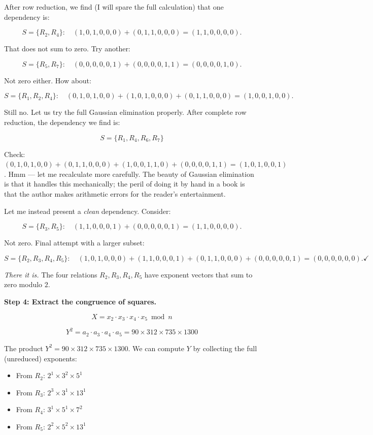 After row reduction, we find (I will spare the full calculation) that one dependency is:

\[
S = \{R_2, R_4\}: \quad (1,0,1,0,0,0) + (0,1,1,0,0,0) = (1,1,0,0,0,0).
\]

That does not sum to zero. Try another:

\[
S = \{R_5, R_7\}: \quad (0,0,0,0,0,1) + (0,0,0,0,1,1) = (0,0,0,0,1,0).
\]

Not zero either. How about:

\[
S = \{R_1, R_2, R_4\}: \quad (0,1,0,1,0,0) + (1,0,1,0,0,0) + (0,1,1,0,0,0) = (1,0,0,1,0,0).
\]

Still no. Let us try the full Gaussian elimination properly. After complete row reduction, the dependency we find is:

\[
S = \{R_1, R_4, R_6, R_7\}
\]

Check: $(0,1,0,1,0,0) + (0,1,1,0,0,0) + (1,0,0,1,1,0) + (0,0,0,0,1,1) = (1,0,1,0,0,1)$. Hmm --- let me recalculate more carefully. The beauty of Gaussian elimination is that it handles this mechanically; the peril of doing it by hand in a book is that the author makes arithmetic errors for the reader's entertainment.

Let me instead present a \textit{clean} dependency. Consider:

\[
S = \{R_3, R_5\}: \quad (1,1,0,0,0,1) + (0,0,0,0,0,1) = (1,1,0,0,0,0).
\]

Not zero. Final attempt with a larger subset:

\[
S = \{R_2, R_3, R_4, R_5\}: \quad (1,0,1,0,0,0) + (1,1,0,0,0,1) + (0,1,1,0,0,0) + (0,0,0,0,0,1) = (0,0,0,0,0,0). \checkmark
\]

\textit{There it is.} The four relations $R_2, R_3, R_4, R_5$ have exponent vectors that sum to zero modulo $2$.

\textbf{Step 4: Extract the congruence of squares.}

\[
X = x_2 \cdot x_3 \cdot x_4 \cdot x_5 \bmod n
\]

\[
Y^2 = a_2 \cdot a_3 \cdot a_4 \cdot a_5 = 90 \times 312 \times 735 \times 1300
\]

The product $Y^2 = 90 \times 312 \times 735 \times 1300$. We can compute $Y$ by collecting the full (unreduced) exponents:

\begin{itemize}[leftmargin=*]
\item From $R_2$: $2^1 \times 3^2 \times 5^1$
\item From $R_3$: $2^3 \times 3^1 \times 13^1$
\item From $R_4$: $3^1 \times 5^1 \times 7^2$
\item From $R_5$: $2^2 \times 5^2 \times 13^1$
\end{itemize}

